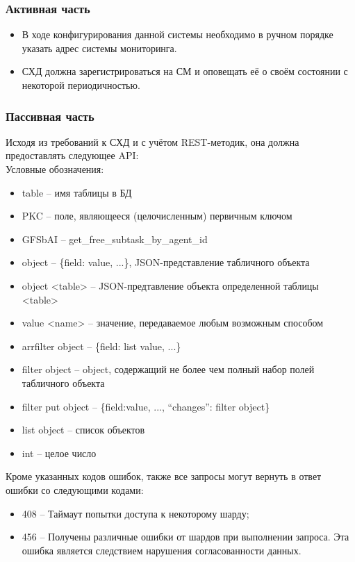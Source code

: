 \documentclass[a4paper,12pt]{report}
\numberwithin{equation}{section}
\begin{document}
  \subsubsection{Активная часть}
  \begin{itemize}
    \item В ходе конфигурирования данной системы необходимо в ручном порядке указать адрес системы мониторинга.
    \item СХД должна зарегистрироваться на СМ и оповещать её о своём состоянии с некоторой периодичностью.
  \end{itemize}
  
  \subsubsection{Пассивная часть}
  Исходя из требований к СХД и с учётом REST-методик, она должна предоставлять следующее API:
  \\
  Условные обозначения:
  \begin{itemize}
    \item table -- имя таблицы в БД
    \item PKC -- поле, являющееся (целочисленным) первичным ключом
    \item GFSbAI -- get\_free\_subtask\_by\_agent\_id
    \item object -- \{field: value, ...\}, JSON-представление табличного объекта
    \item object <table> -- JSON-предтавление объекта определенной таблицы <table>
    \item value <name> -- значение, передаваемое любым возможным способом
    \item arrfilter object -- \{field: list value, ...\}
    \item filter object -- object, содержащий не более чем полный набор полей табличного объекта
    \item filter put object -- \{field:value, ..., ``changes'': filter object\}
    \item list object -- список объектов
    \item int -- целое число
  \end{itemize}
  
  
  Кроме указанных кодов ошибок, также все запросы могут вернуть в ответ ошибки со следующими кодами:
  \begin{itemize}
    \item 408 -- Таймаут попытки доступа к некоторому шарду;
    \item 456 -- Получены различные ошибки от шардов при выполнении запроса. Эта ошибка является следствием нарушения согласованности данных.
  \end{itemize}
  
\end{document}
